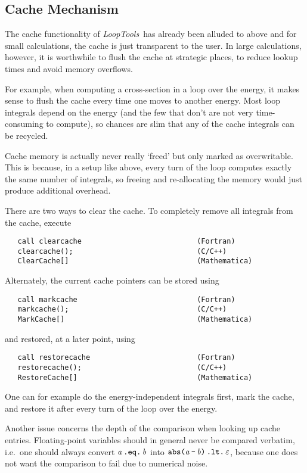 \documentclass[twoside,12pt]{report}
\def\LT{\textit{LoopTools}}
\def\ie{i.e.\ }
\def\Code#1{\ensuremath{\texttt{#1}}}
\def\Var#1{\ensuremath{\mathit{#1}}}
\def\Va{\Var{a}}
\def\Vb{\Var{b}}
\begin{document}
\subsection{Cache Mechanism}
%
%
%

The cache functionality of \LT\ has already been alluded to above
and for small calculations, the cache is just transparent to the user.
In large calculations, however, it is worthwhile to flush the cache
at strategic places, to reduce lookup times and avoid memory overflows.

For example, when computing a cross-section in a loop over the energy,
it makes sense to flush the cache every time one moves to another
energy.  Most loop integrals depend on the energy (and the few that 
don't are not very time-consuming to compute), so chances are slim
that any of the cache integrals can be recycled.

Cache memory is actually never really `freed' but only marked as
overwritable.  This is because, in a setup like above, every turn
of the loop computes exactly the same number of integrals, so freeing
and re-allocating the memory would just produce additional overhead.

There are two ways to clear the cache.  To completely remove all
integrals from the cache, execute
\begin{verbatim}
   call clearcache                           (Fortran)
   clearcache();                             (C/C++)
   ClearCache[]                              (Mathematica)
\end{verbatim}

Alternately, the current cache pointers can be stored using
\begin{verbatim}
   call markcache                            (Fortran)
   markcache();                              (C/C++)
   MarkCache[]                               (Mathematica)
\end{verbatim}
and restored, at a later point, using
\begin{verbatim}
   call restorecache                         (Fortran)
   restorecache();                           (C/C++)
   RestoreCache[]                            (Mathematica)
\end{verbatim}
One can for example do the energy-independent integrals first,
mark the cache, and restore it after every turn of the loop
over the energy.

Another issue concerns the depth of the comparison when looking up cache
entries.  Floating-point variables should in general never be compared
verbatim, \ie one should always convert \Code{\Va\,.eq.\,\Vb} into
\Code{abs(\Va\,-\,\Vb)\,.lt.\,$\varepsilon$}, because one does not want 
the comparison to fail due to numerical noise.
\end{document}
